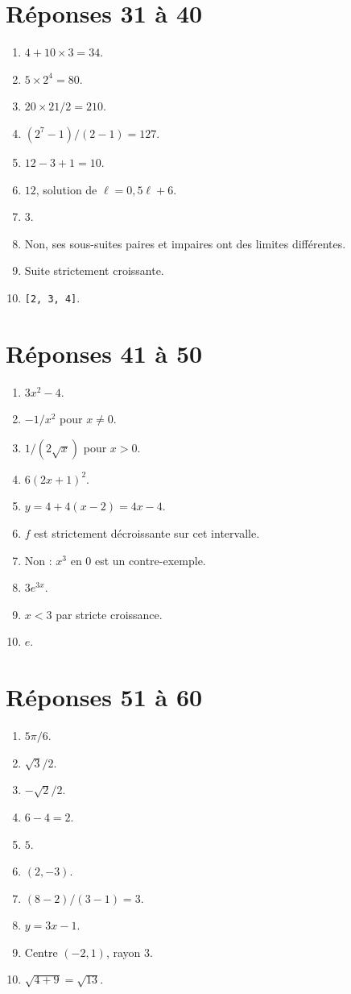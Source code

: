 \documentclass[11pt,a4paper,oneside]{book}
\begin{document}
\section{Réponses 31 à 40}
\begin{enumerate}[start=31]
\item $4+10\times3=34$.
\item $5\times2^4=80$.
\item $20\times21/2=210$.
\item $(2^7-1)/(2-1)=127$.
\item $12-3+1=10$.
\item $12$, solution de $\ell=0{,}5\ell+6$.
\item $3$.
\item Non, ses sous-suites paires et impaires ont des limites différentes.
\item Suite strictement croissante.
\item \texttt{[2, 3, 4]}.
\end{enumerate}
\section{Réponses 41 à 50}
\begin{enumerate}[start=41]
\item $3x^2-4$.
\item $-1/x^2$ pour $x\ne0$.
\item $1/(2\sqrt x)$ pour $x>0$.
\item $6(2x+1)^2$.
\item $y=4+4(x-2)=4x-4$.
\item $f$ est strictement décroissante sur cet intervalle.
\item Non : $x^3$ en $0$ est un contre-exemple.
\item $3e^{3x}$.
\item $x<3$ par stricte croissance.
\item $e$.
\end{enumerate}
\section{Réponses 51 à 60}
\begin{enumerate}[start=51]
\item $5\pi/6$.
\item $\sqrt3/2$.
\item $-\sqrt2/2$.
\item $6-4=2$.
\item $5$.
\item $(2,-3)$.
\item $(8-2)/(3-1)=3$.
\item $y=3x-1$.
\item Centre $(-2,1)$, rayon $3$.
\item $\sqrt{4+9}=\sqrt{13}$.
\end{enumerate}
\end{document}
